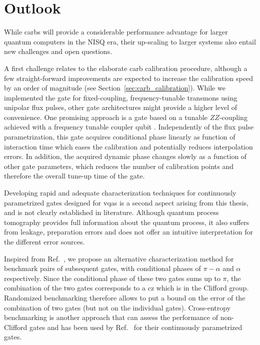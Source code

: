 \chapter{Outlook} \label{ch:outlook}
While \glspl{carb} will provide a considerable performance advantage for larger quantum computers in the NISQ era, their up-scaling to larger systems also entail new challenges and open questions.

A first challenge relates to the elaborate \gls{carb} calibration procedure, although a few straight-forward improvements are expected to increase the calibration speed by an order of magnitude (see Section~\ref{sec:carb_calibration}). While we implemented the gate for fixed-coupling,  frequency-tunable transmons using unipolar flux pulses, other gate architectures might provide a higher level of convenience. One promising approach is a gate based on a tunable $ZZ$-coupling achieved with a frequency tunable coupler qubit \cite{Collodo2020}.  Independently of the flux pulse parametrization, this gate acquires conditional phase linearly as function of interaction time which eases the calibration and potentially reduces interpolation errors. In addition, the acquired dynamic phase changes slowly as a function of other gate parameters, which reduces the number of calibration points and therefore the overall tune-up time of the gate. 

Developing rapid and adequate characterization techniques for continuously parametrized gates designed for \glspl{vqa} is a second aspect arising from this thesis, and is not clearly established in literature. Although quantum process tomography provides full information about the quantum process, it also suffers from leakage, preparation errors and does not offer an intuitive interpretation for the different error sources. 

Inspired from Ref.~\cite{Abrams2019ImplementationPulse}, we propose an alternative characterization method for benchmark pairs of subsequent gates, with conditional phases of $\pi-\alpha$ and $\alpha$ respectively. Since the conditional phase of these two gates sums up to $\pi$, the combination of the two gates corresponds to a \gls{cz} which is in the Clifford group.  Randomized benchmarking therefore allows to put a bound on the error of the combination of two gates (but not on the individual gates). Cross-entropy benchmarking \cite{BarendsDiabaticQubits} is another approach that can assess the performance of non-Clifford gates and has been used by Ref.~\cite{Foxen2020DemonstratingAlgorithms} for their continuously parametrized gates.

